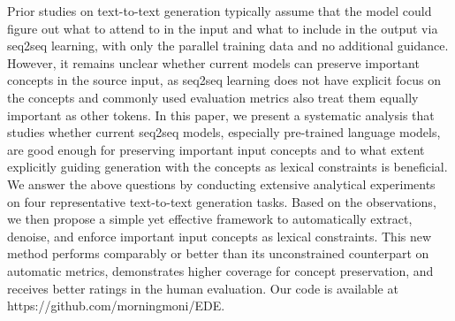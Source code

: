 Prior studies on text-to-text generation typically assume that the model could figure out what to attend to in the input and what to include in the output via seq2seq learning, with only the parallel training data and no additional guidance. However, it remains unclear whether current models can preserve important concepts in the source input, as seq2seq learning does not have explicit focus on the concepts and commonly used evaluation metrics also treat them equally important as other tokens. In this paper, we present a systematic analysis that studies whether current seq2seq models, especially pre-trained language models, are good enough for preserving important input concepts and to what extent explicitly guiding generation with the concepts as lexical constraints is beneficial. We answer the above questions by conducting extensive analytical experiments on four representative text-to-text generation tasks. Based on the observations, we then propose a simple yet effective framework to automatically extract, denoise, and enforce important input concepts as lexical constraints. This new method performs comparably or better than its unconstrained counterpart on automatic metrics, demonstrates higher coverage for concept preservation, and receives better ratings in the human evaluation. Our code is available at https://github.com/morningmoni/EDE.

